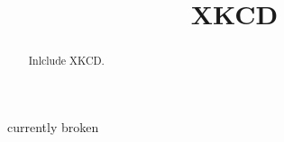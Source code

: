 \documentclass{ximera}
\title[Example:]{XKCD}
\begin{document}
\begin{abstract}
  Inlclude XKCD.
\end{abstract}
\maketitle

currently broken
\end{document}
